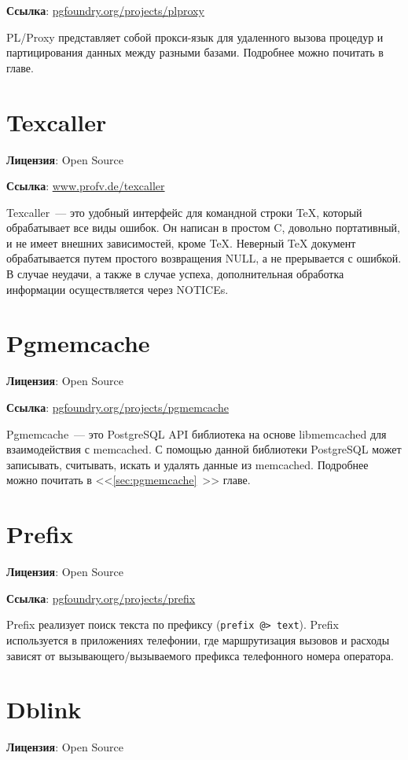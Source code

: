 \textbf{Ссылка}: \href{http://pgfoundry.org/projects/plproxy/}{pgfoundry.org/projects/plproxy}

PL/Proxy представляет собой прокси-язык для удаленного вызова процедур и партицирования данных между разными базами. Подробнее можно почитать в  главе.

\section{Texcaller}
\textbf{Лицензия}: Open Source

\textbf{Ссылка}: \href{http://www.profv.de/texcaller/}{www.profv.de/texcaller}

Texcaller~--- это удобный интерфейс для командной строки TeX, который обрабатывает все виды ошибок. Он написан в простом C, довольно портативный, и не имеет внешних зависимостей, кроме TeX. Неверный TeX документ обрабатывается путем простого возвращения NULL, а не прерывается с ошибкой. В случае неудачи, а также в случае успеха, дополнительная обработка информации осуществляется через NOTICEs.

\section{Pgmemcache}
\textbf{Лицензия}: Open Source

\textbf{Ссылка}: \href{http://pgfoundry.org/projects/pgmemcache/}{pgfoundry.org/projects/pgmemcache}

Pgmemcache~--- это PostgreSQL API библиотека на основе libmemcached для взаимодействия с memcached. С помощью данной библиотеки PostgreSQL может записывать, считывать, искать и удалять данные из memcached. Подробнее можно почитать в <<\ref{sec:pgmemcache}~>> главе.

\section{Prefix}
\textbf{Лицензия}: Open Source

\textbf{Ссылка}: \href{http://pgfoundry.org/projects/prefix}{pgfoundry.org/projects/prefix}

Prefix реализует поиск текста по префиксу (\lstinline!prefix @> text!). Prefix используется в приложениях телефонии, где маршрутизация вызовов и расходы зависят от вызывающего/вызываемого префикса телефонного номера оператора.

\section{Dblink}
\textbf{Лицензия}: Open Source


